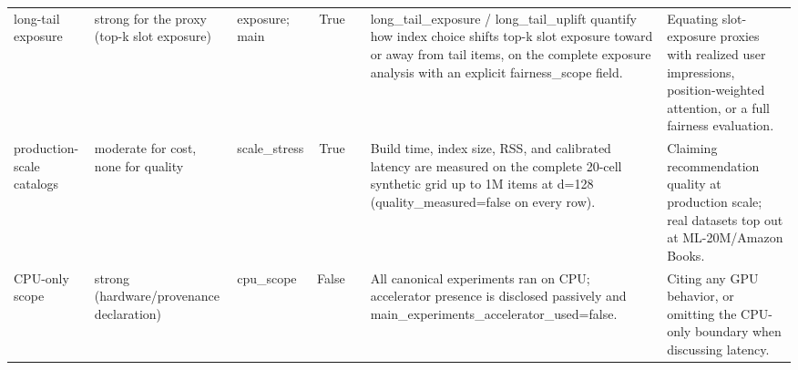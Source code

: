 \begin{tabular}{lllrlll}
long-tail exposure & strong for the proxy (top-k slot exposure) & exposure; main & True &  & long_tail_exposure / long_tail_uplift quantify how index choice shifts top-k slot exposure toward or away from tail items, on the complete exposure analysis with an explicit fairness_scope field. & Equating slot-exposure proxies with realized user impressions, position-weighted attention, or a full fairness evaluation. \\
production-scale catalogs & moderate for cost, none for quality & scale_stress & True &  & Build time, index size, RSS, and calibrated latency are measured on the complete 20-cell synthetic grid up to 1M items at d=128 (quality_measured=false on every row). & Claiming recommendation quality at production scale; real datasets top out at ML-20M/Amazon Books. \\
CPU-only scope & strong (hardware/provenance declaration) & cpu_scope & False &  & All canonical experiments ran on CPU; accelerator presence is disclosed passively and main_experiments_accelerator_used=false. & Citing any GPU behavior, or omitting the CPU-only boundary when discussing latency. \\
\bottomrule
\end{tabular}

